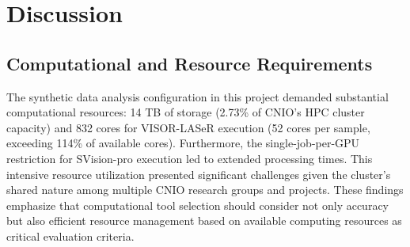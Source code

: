\chapter{Discussion}

\section{Computational and Resource Requirements}

The synthetic data analysis configuration in this project demanded substantial 
computational resources: 14 TB of storage (2.73\% of CNIO's HPC cluster 
capacity) and 832 cores for VISOR-LASeR execution (52 cores per sample, 
exceeding 114\% of available cores). Furthermore, the single-job-per-GPU 
restriction for SVision-pro execution led to extended processing times. This 
intensive resource utilization presented significant challenges given the 
cluster's shared nature among multiple CNIO research groups and projects.
These findings emphasize that computational tool selection should consider not 
only accuracy but also efficient resource management based on available 
computing resources as critical evaluation criteria.



